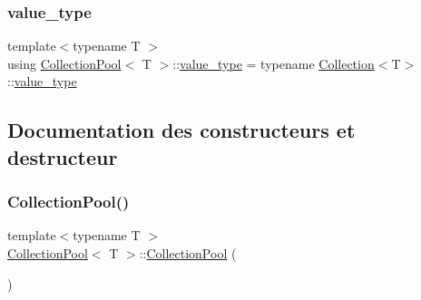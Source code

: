 \mbox{\label{class_collection_pool_a018a408f2c2bcdf2b542141dbc1d1c17}} 
\subsubsection{\texorpdfstring{value\+\_\+type}{value\_type}}
{\footnotesize\ttfamily template$<$typename T $>$ \\
using \hyperlink{class_collection_pool}{Collection\+Pool}$<$ T $>$\+::\hyperlink{class_collection_pool_a018a408f2c2bcdf2b542141dbc1d1c17}{value\+\_\+type} =  typename \hyperlink{class_collection}{Collection}$<$T$>$\+::\hyperlink{class_collection_pool_a018a408f2c2bcdf2b542141dbc1d1c17}{value\+\_\+type}}



\subsection{Documentation des constructeurs et destructeur}
\mbox{\label{class_collection_pool_a6e58d0618310fcb2d5114a41c346c1f8}} 
\subsubsection{\texorpdfstring{Collection\+Pool()}{CollectionPool()}\hspace{0.1cm}{\footnotesize\ttfamily [1/3]}}
{\footnotesize\ttfamily template$<$typename T $>$ \\
\hyperlink{class_collection_pool}{Collection\+Pool}$<$ T $>$\+::\hyperlink{class_collection_pool}{Collection\+Pool} (\begin{DoxyParamCaption}{ }\end{DoxyParamCaption})\hspace{0.3cm}{\ttfamily [default]}}

\mbox{\label{class_collection_pool_a65f8fd9c44e03d841391dd50fe953d4a}} 
